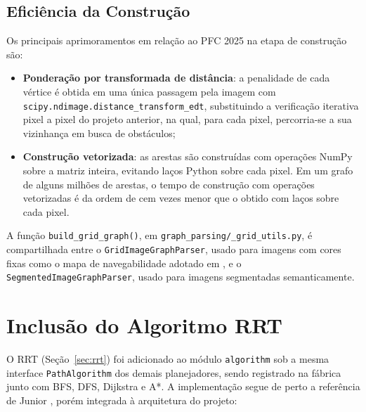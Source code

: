 \documentclass[
    12pt,
    openright,
    oneside,
    a4paper,
    english,
    brazil
]{abntex2}
\begin{document}
\subsection{Eficiência da Construção}

Os principais aprimoramentos em relação ao PFC 2025 \cite{camelo2025} na etapa de construção são:

\begin{itemize}
    \item \textbf{Ponderação por transformada de distância}: a penalidade de cada vértice é obtida em uma única passagem pela imagem com \texttt{scipy.\allowbreak ndimage.\allowbreak distance\_\allowbreak{}\allowbreak transform\_\allowbreak{}\allowbreak edt}, substituindo a verificação iterativa pixel a pixel do projeto anterior, na qual, para cada pixel, percorria-se a sua vizinhança em busca de obstáculos;
    \item \textbf{Construção vetorizada}: as arestas são construídas com operações NumPy sobre a matriz inteira, evitando laços Python sobre cada pixel. Em um grafo de alguns milhões de arestas, o tempo de construção com operações vetorizadas é da ordem de cem vezes menor que o obtido com laços sobre cada pixel.
\end{itemize}

A função \texttt{build\_\allowbreak{}grid\_\allowbreak{}graph()}, em \texttt{graph\_\allowbreak{}parsing/\allowbreak{}\_\allowbreak{}grid\_\allowbreak{}utils.py}, é compartilhada entre o \texttt{GridImageGraphParser}, usado para imagens com cores fixas como o mapa de navegabilidade adotado em \cite{junior2025_rrt}, e o \texttt{SegmentedImageGraphParser}, usado para imagens segmentadas semanticamente.

\section{Inclusão do Algoritmo RRT}
\label{sec:impl_rrt}

O RRT (Seção~\ref{sec:rrt}) foi adicionado ao módulo \texttt{algorithm} sob a mesma interface \texttt{PathAlgorithm} dos demais planejadores, sendo registrado na fábrica junto com BFS, DFS, Dijkstra e A*. A implementação segue de perto a referência de Junior \cite{junior2025_rrt}, porém integrada à arquitetura do projeto:
\end{document}
